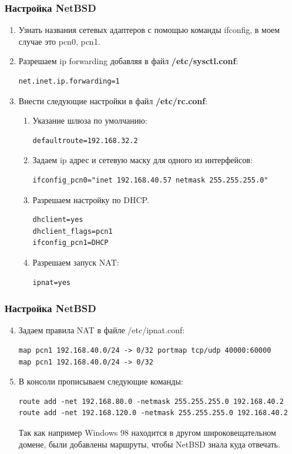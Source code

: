 \documentclass[9pt, compress]{beamer}
\begin{document}
\begin{frame}[fragile]
\frametitle{Настройка NetBSD}
\begin{enumerate}
\item Узнать названия сетевых адаптеров с помощью команды ifconfig, в моем случае это pcn0, pcn1.
\item Разрешаем ip forwarding добавляя в файл \textbf{/etc/sysctl.conf}:
\begin{lstlisting}[language={}]
net.inet.ip.forwarding=1
\end{lstlisting}
\item Внести следующие настройки в файл \textbf{/etc/rc.conf}:
\begin{enumerate}
\item Указание шлюза по умолчанию:
\begin{lstlisting}[language={}]
defaultroute=192.168.32.2
\end{lstlisting}
\item Задаем ip адрес и сетевую маску для одного из интерфейсов:
\begin{lstlisting}[language={}]
ifconfig_pcn0="inet 192.168.40.57 netmask 255.255.255.0"
\end{lstlisting}
\item Разрешаем настройку по DHCP.
\begin{lstlisting}[language={}]
dhclient=yes	
dhclient_flags=pcn1
ifconfig_pcn1=DHCP
\end{lstlisting}
\item Разрешаем запуск NAT:
\begin{lstlisting}[language={}]
ipnat=yes
\end{lstlisting}
\end{enumerate}
\end{enumerate}
\end{frame}

\begin{frame}[fragile]
\frametitle{Настройка NetBSD}
\begin{enumerate}
\setcounter{enumi}{3}
\item Задаем правила NAT в файле /etc/ipnat.conf:
\begin{lstlisting}[language={}]
map pcn1 192.168.40.0/24 -> 0/32 portmap tcp/udp 40000:60000
map pcn1 192.168.40.0/24 -> 0/32
\end{lstlisting}
\item В консоли прописываем следующие команды:
\begin{lstlisting}[language={}]
route add -net 192.168.80.0 -netmask 255.255.255.0 192.168.40.2
route add -net 192.168.120.0 -netmask 255.255.255.0 192.168.40.2
\end{lstlisting}
Так как например Windows 98 находится в другом широковещательном домене, были добавлены маршруты, чтобы NetBSD знала куда отвечать.
\end{enumerate}
\end{frame}
\end{document}
